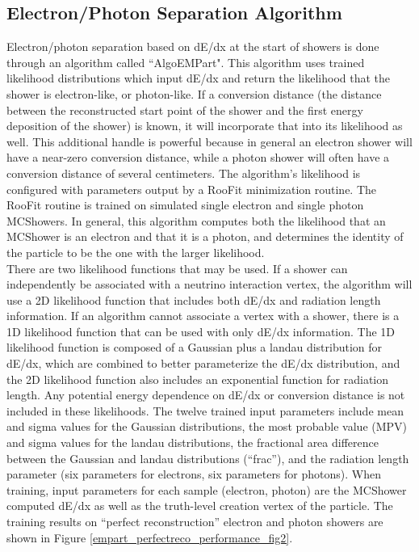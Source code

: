 \subsection{Electron/Photon Separation Algorithm}\label{algoempart_section}
Electron/photon separation based on dE/dx at the start of showers is done through an algorithm called ``AlgoEMPart". This algorithm uses trained likelihood distributions which input dE/dx and return the likelihood that the shower is electron-like, or photon-like. If a conversion distance (the distance between the reconstructed start point of the shower and the first energy deposition of the shower) is known, it will incorporate that into its likelihood as well. This additional handle is powerful because in general an electron shower will have a near-zero conversion distance, while a photon shower will often have a conversion distance of several centimeters. The algorithm's likelihood is configured with parameters output by a RooFit \cite{ROOFITsource} minimization routine. The RooFit routine is trained on simulated single electron and single photon {\sc MCShowers}. In general, this algorithm computes both the likelihood that an {\sc MCShower} is an electron and that it is a photon, and determines the identity of the particle to be the one with the larger likelihood.\\

There are two likelihood functions that may be used. If a shower can independently be associated with a neutrino interaction vertex, the algorithm will use a 2D likelihood function that includes both dE/dx and radiation length information. If an algorithm cannot associate a vertex with a shower, there is a 1D likelihood function that can be used with only dE/dx information. The 1D likelihood function is composed of a Gaussian plus a landau distribution for dE/dx, which are combined to better parameterize the dE/dx distribution, and the 2D likelihood function also includes an exponential function for radiation length. Any potential energy dependence on dE/dx or conversion distance is not included in these likelihoods. The twelve trained input parameters include mean and sigma values for the Gaussian distributions, the most probable value (MPV) and sigma values for the landau distributions, the fractional area difference between the Gaussian and landau distributions (``frac''), and the radiation length parameter (six parameters for electrons, six parameters for photons). When training, input parameters for each sample (electron, photon) are the {\sc MCShower} computed dE/dx as well as the truth-level creation vertex of the particle. The training results on ``perfect reconstruction'' electron and photon showers are shown in Figure \ref{empart_perfectreco_performance_fig2}.%


